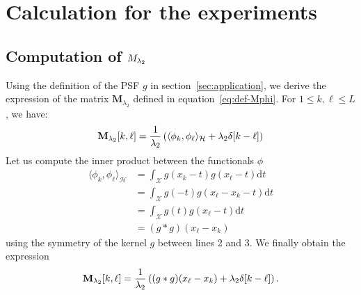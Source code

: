 \clearpage
\section{Calculation for the experiments}
    \label{app:calculation}

    \subsection{Computation of \texorpdfstring{$M_{\lambda_{2}}$}{M lambda 2}}

    Using the definition of the PSF $g$ in section~\ref{sec:application}, we derive the expression of the matrix $\mathbf{M}_{\lambda_2}$ defined in equation~\eqref{eq:def-Mphi}. For $1\leq k, \ell \leq L$, we have:
    \begin{equation*}
        \mathbf{M}_{\lambda_{2}}[k, \ell] = \frac{1}{\lambda_{2}} \left( \langle \phi_k , \phi_\ell \rangle_{\mathcal{H}} + \lambda_{2} \delta[k - \ell] \right)
    \end{equation*}
    Let us compute the inner product between the functionals $\phi$
    \begin{equation*}
        \begin{aligned}
            \langle \phi_k , \phi_\ell \rangle_{\mathcal{H}} &= \int_\mathcal{X} g(x_k - t) g(x_\ell - t) \mathrm{d}t \\
                &= \int_\mathcal{X} g(- t) g(x_\ell - x_k - t) \mathrm{d}t \\
                &= \int_\mathcal{X} g(t) g(x_\ell - t) \mathrm{d}t \\
                &=  (g * g)(x_\ell - x_k)
        \end{aligned}
    \end{equation*}
    using the symmetry of the kernel $g$ between lines 2 and 3.
    We finally obtain the expression
    \begin{equation*}
        \label{eq:mlambda-1d}
        \mathbf{M}_{\lambda_2}[k, \ell] = \frac{1}{\lambda_{2}} \left( (g * g)(x_\ell - x_k) + \lambda_{2} \delta [k - \ell] \right) .
    \end{equation*}

